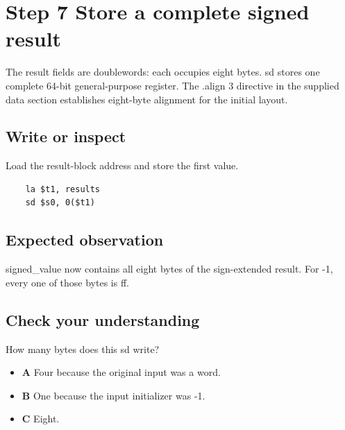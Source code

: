 \section{Step 7 Store a complete signed
  result}\label{004-bit-inspector-s07-step-7-store-a-complete-signed-result}

The result fields are doublewords: each occupies eight bytes. sd stores
one complete 64-bit general-purpose register. The .align 3 directive in
the supplied data section establishes eight-byte alignment for the
initial layout.

\subsection{Write or
  inspect}\label{004-bit-inspector-s07-write-or-inspect}

Load the result-block address and store the first value.

\begin{verbatim}
    la $t1, results
    sd $s0, 0($t1)
\end{verbatim}

\subsection{Expected
  observation}\label{004-bit-inspector-s07-expected-observation}

signed\_value now contains all eight bytes of the sign-extended result.
For -1, every one of those bytes is ff.

\subsection{Check your
  understanding}\label{004-bit-inspector-s07-check-your-understanding}

How many bytes does this sd write?

\begin{itemize}
  \tightlist
  \item
        \textbf{A} Four because the original input was a word.
  \item
        \textbf{B} One because the input initializer was -1.
  \item
        \textbf{C} Eight.
\end{itemize}
